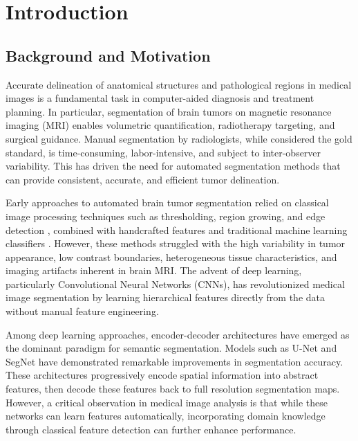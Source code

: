 \chapter{Introduction}
\label{chap:intro}

\section{Background and Motivation} 
\label{sec:background_motivation}

Accurate delineation of anatomical structures and pathological regions in medical images is a fundamental task in computer-aided diagnosis and treatment planning. In particular, segmentation of brain tumors on magnetic resonance imaging (MRI) enables volumetric quantification, radiotherapy targeting, and surgical guidance. Manual segmentation by radiologists, while considered the gold standard, is time-consuming, labor-intensive, and subject to inter-observer variability. This has driven the need for automated segmentation methods that can provide consistent, accurate, and efficient tumor delineation.

Early approaches to automated brain tumor segmentation relied on classical image processing techniques such as thresholding, region growing, and edge detection \cite{gonzalez2002digital}, combined with handcrafted features and traditional machine learning classifiers \cite{gordillo2013state}. However, these methods struggled with the high variability in tumor appearance, low contrast boundaries, heterogeneous tissue characteristics, and imaging artifacts inherent in brain MRI. The advent of deep learning, particularly Convolutional Neural Networks (CNNs), has revolutionized medical image segmentation by learning hierarchical features directly from the data without manual feature engineering.

Among deep learning approaches, encoder-decoder architectures have emerged as the dominant paradigm for semantic segmentation. Models such as U-Net \cite{ronneberger2015unet} and SegNet \cite{badrinarayanan2017segnet} have demonstrated remarkable improvements in segmentation accuracy. These architectures progressively encode spatial information into abstract features, then decode these features back to full resolution segmentation maps. However, a critical observation in medical image analysis is that while these networks can learn features automatically, incorporating domain knowledge through classical feature detection can further enhance performance.

